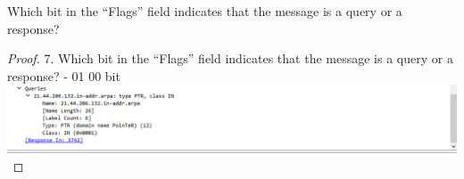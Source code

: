 \documentclass[../../main.tex]{subfiles}
\begin{document}
\begin{wts}
Which bit in the “Flags” field indicates that the message is a query or a response?
\end{wts}
\begin{proof}
7. Which bit in the “Flags” field indicates that the message is a query or a response? - 01 00 bit\\
\includegraphics[width=\textwidth]{subfiles/images/308_Lab5_Part_1_PAGE1_2_Image24.png}
\end{proof}
\end{document}
